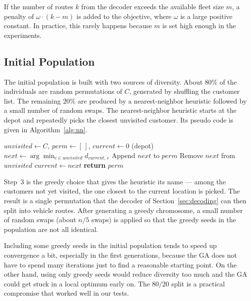 \documentclass [a4paper, 11pt, titlepage] {article}
\begin{document}
If the number of routes $k$ from the decoder exceeds the available fleet size $m$, a penalty of $\omega \cdot (k - m)$ is added to the objective, where $\omega$ is a large positive constant. In practice, this rarely happens because $m$ is set high enough in the experiments.

\subsection{Initial Population}
\label{sec:initpop}

The initial population is built with two sources of diversity. About $80\%$ of the individuals are random permutations of $C$, generated by shuffling the customer list. The remaining $20\%$ are produced by a nearest-neighbor heuristic followed by a small number of random swaps. The nearest-neighbor heuristic starts at the depot and repeatedly picks the closest unvisited customer. Its pseudo code is given in Algorithm~\ref{alg:nn}.

\begin{algorithm}[H]
\caption{Nearest-Neighbor Greedy Heuristic}
\label{alg:nn}
\begin{algorithmic}[1]
    \State $unvisited \gets C$, $perm \gets [\,]$, $current \gets 0$ (depot)
        \State $next \gets \arg\min_{c \in unvisited} d_{current,\,c}$
        \State Append $next$ to $perm$
        \State Remove $next$ from $unvisited$
        \State $current \gets next$
    \EndWhile
    \State \textbf{return} $perm$
\end{algorithmic}
\end{algorithm}

Step~3 is the greedy choice that gives the heuristic its name --- among the customers not yet visited, the one closest to the current location is picked. The result is a single permutation that the decoder of Section~\ref{sec:decoding} can then split into vehicle routes. After generating a greedy chromosome, a small number of random swaps (about $n/5$ swaps) is applied so that the greedy seeds in the population are not all identical.

Including some greedy seeds in the initial population tends to speed up convergence a bit, especially in the first generations, because the GA does not have to spend many iterations just to find a reasonable starting point. On the other hand, using only greedy seeds would reduce diversity too much and the GA could get stuck in a local optimum early on. The $80/20$ split is a practical compromise that worked well in our tests.
\end{document}
